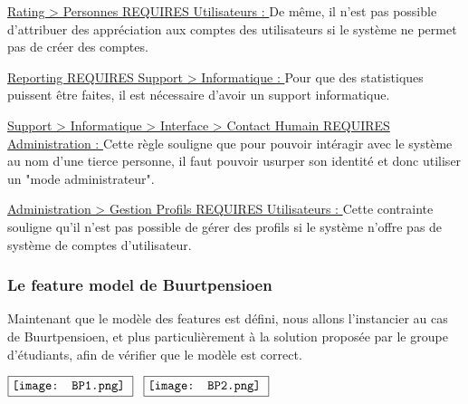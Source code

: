 \underline{Rating > Personnes REQUIRES Utilisateurs : }  De même,  il n'est pas possible d'attribuer des appréciation aux comptes des utilisateurs si le système ne permet pas de créer des comptes.

\underline{Reporting REQUIRES Support > Informatique : } Pour que des statistiques puissent être faites,  il est nécessaire d'avoir un support informatique.  

\underline{Support > Informatique > Interface > Contact Humain REQUIRES Administration : }  Cette règle souligne que pour pouvoir intéragir avec le système au nom d'une tierce personne,  il faut pouvoir usurper son identité et donc utiliser un "mode administrateur".  

\underline{Administration > Gestion Profils REQUIRES Utilisateurs : } Cette contrainte souligne qu'il n'est pas possible de gérer des profils si le système n'offre pas de système de comptes d'utilisateur.

\subsubsection{Le feature model de Buurtpensioen}

Maintenant que le modèle des features est défini,  nous allons l'instancier au cas de Buurtpensioen,  et plus particulièrement à la solution proposée par le groupe d'étudiants,  afin de vérifier que le modèle est correct.

$\vcenter{\hbox{\fbox{\texttt{[image: BP1.png]} } }}$ \hspace{3 cm}
$\vcenter{\hbox{\fbox{\texttt{[image: BP2.png]} } }}$
